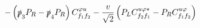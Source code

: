 %
\begin{dmath*}
%
  -   \left(\slashed{p}_{3} P_R - \slashed{p}_{4} P_R\right) C^{ \varphi  u}_{f_1 f_2}  -  \frac{v}{\sqrt{2}} \left(P_L C^{u \varphi  *}_{f_2 f_1} - P_R C^{u \varphi  }_{f_1 f_2}\right)
%
\end{dmath*}
%
